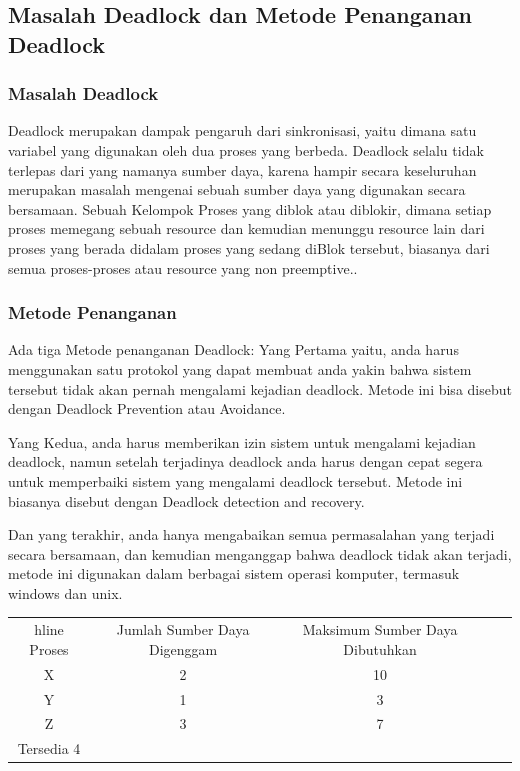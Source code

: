 \subsection {Masalah Deadlock dan Metode Penanganan Deadlock}
\subsubsection {Masalah Deadlock}
	Deadlock merupakan dampak pengaruh dari sinkronisasi, yaitu dimana satu variabel yang digunakan oleh dua proses yang berbeda. Deadlock selalu tidak terlepas dari yang namanya sumber daya, karena hampir secara keseluruhan merupakan masalah mengenai sebuah sumber daya yang digunakan secara bersamaan. Sebuah Kelompok Proses yang diblok atau diblokir, dimana setiap proses memegang sebuah resource dan kemudian menunggu resource lain dari proses yang berada didalam proses yang sedang diBlok tersebut, biasanya dari semua proses-proses atau resource yang non preemptive..
	
\subsubsection {Metode Penanganan}
	Ada tiga Metode penanganan Deadlock:
	Yang Pertama yaitu, anda harus menggunakan satu protokol yang dapat membuat anda yakin bahwa sistem tersebut tidak akan pernah mengalami kejadian deadlock. Metode ini bisa disebut dengan Deadlock Prevention atau Avoidance.
	
	Yang Kedua, anda harus memberikan izin sistem untuk mengalami kejadian deadlock, namun setelah terjadinya deadlock anda harus dengan cepat segera untuk memperbaiki sistem yang mengalami deadlock tersebut. Metode ini biasanya disebut dengan Deadlock detection and recovery.
	
	Dan yang terakhir, anda hanya mengabaikan semua permasalahan yang terjadi secara bersamaan, dan kemudian menganggap bahwa deadlock tidak akan terjadi, metode ini digunakan dalam berbagai sistem operasi komputer, termasuk windows dan unix.

\begin{table}[H]
\begin{tabular}{|c|c|c|c|c|}
hline
Proses & Jumlah Sumber Daya Digenggam & Maksimum Sumber Daya Dibutuhkan\\

X   & 2 & 10\\
Y   & 1 & 3\\
Z   & 3 & 7\\

Tersedia 4  &  &\\

\end{tabular}
\end{table}

